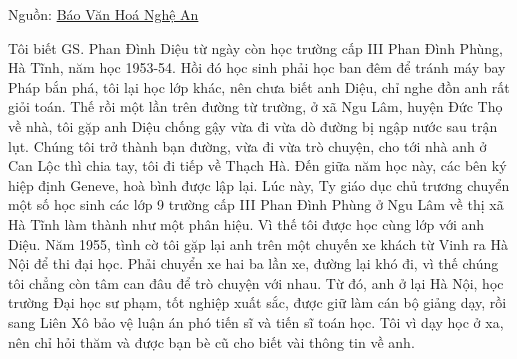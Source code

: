 Nguồn: \href{http://www.vanhoanghean.com.vn/component/k2/31-nguoi-xu-nghe/12442-giao-su-phan-dinh-dieu-tai-nang-va-tam-huyet}{Báo Văn Hoá Nghệ An}

Tôi biết GS. Phan Đình Diệu từ ngày còn học trường cấp III Phan Đình Phùng, Hà Tĩnh, năm học 1953-54. Hồi đó học sinh phải học ban đêm để tránh máy bay Pháp bắn phá, tôi lại học lớp khác, nên chưa biết anh Diệu, chỉ nghe đồn anh rất giỏi toán. Thế rồi một lần trên đường từ trường, ở xã Ngu Lâm, huyện Đức Thọ về nhà, tôi gặp anh Diệu chống gậy vừa đi vừa dò đường bị ngập nước sau trận lụt. Chúng tôi trở thành bạn đường, vừa đi vừa trò chuyện, cho tới nhà anh ở Can Lộc thì chia tay, tôi đi tiếp về Thạch Hà. Đến giữa năm học này, các bên ký hiệp định Geneve, hoà bình được lập lại. Lúc này, Ty giáo dục chủ trương chuyển một số học sinh các lớp 9 trường cấp III Phan Đình Phùng ở Ngu Lâm về thị xã Hà Tĩnh làm thành như một phân hiệu. Vì thế tôi được học cùng lớp với anh Diệu. Năm 1955, tình cờ tôi gặp lại anh trên một chuyến xe khách từ Vinh ra Hà Nội để thi đại học. Phải chuyển xe hai ba lần xe, đường lại khó đi, vì thế chúng tôi chẳng còn tâm can đâu để trò chuyện với nhau. Từ đó, anh ở lại Hà Nội, học trường Đại học sư phạm, tốt nghiệp xuất sắc, được giữ làm cán bộ giảng dạy, rồi sang Liên Xô bảo vệ luận án phó tiến sĩ và tiến sĩ toán học. Tôi vì dạy học ở xa, nên chỉ hỏi thăm và được bạn bè cũ cho biết vài thông tin về anh.

